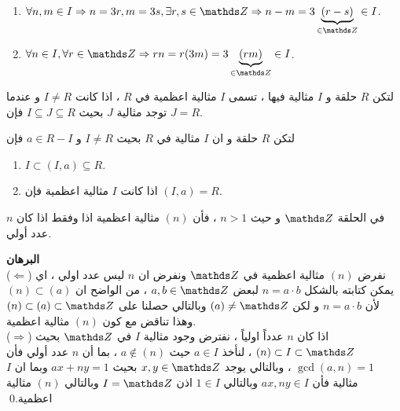  \setLR
 \begin{enumerate}[leftmargin=*, label=$\boxed{\arabic*}$]
 	\item $\forall n,m\in I \Rightarrow n=3r, m=3s, \exists r,s\in \Z \Rightarrow n-m =3\underbrace{(r-s)}_{\in \Z} \in I$.
 	\item $\forall n\in I, \forall r\in \Z \Rightarrow rn = r(3m) = 3\underbrace{(rm)}_{\in \Z} \in I$. 
 \end{enumerate}
 
 \setRL
 
 \begin{definition}
 	لتكن $R$ حلقة و $I$ مثالية فيها ، تسمى $I$ مثالية اعظمية في $R$ ، اذا كانت $I\neq R$ و عندما توجد مثالية $J$ بحيث 
 	$I \subseteq J \subseteq R$ فإن $J=R$.
 \end{definition}
 
 \begin{note}
 	لتكن $R$ حلقة و ان $I$ مثالية في $R$ بحيث  $I\neq R$ و $a\in R - I$ فإن
 	\begin{enumerate}
 		\item $I\subset (I, a) \subseteq R $.
 		\item  اذا كانت $I$ مثالية اعظمية فإن $(I, a) = R$.
 	\end{enumerate}
 \end{note}
 
 \begin{theorem}
 	في الحلقة $\Z$ و حيث $n>1$ ، فأن $(n)$ مثالية اعظمية اذا وفقط اذا كان $n$ عدد أولي.
 \end{theorem}
 
 \noindent
 \textbf{البرهان}\\
 \noindent
 ($\Leftarrow$) نفرض $(n)$ مثالية اعظمية في $\Z$ ونفرض ان $n$ ليس عدد اولي ، اي يمكن كتابته بالشكل $n=a\cdot b$ لبعض $a, b\in \Z$ ، من الواضح ان $(n) \subset (a)$ لأن $n=a\cdot b$ و لكن $(a)\neq \Z$ وبالتالي حصلنا على $(n) \subset (a) \subset \Z$ وهذا تناقض مع كون $(n)$ مثالية اعظمية.\\
 ($\Rightarrow$) اذا كان $n$ عدداً اولياً ، نفترض وجود مثالية $I$ في $\Z$ بحيث $(n )\subset I \subset \Z$ ، لنأخذ $a\in I$ حيث $a\notin (n)$ ، بما أن $n$  عدد أولي فأن $\gcd(a, n) = 1$ ، وبالتالي يوجد $x, y\in \Z$ بحيث $ax + ny=1$ وبما ان $I$ مثالية فأن $ax, ny\in I$ وبالتالي $1\in I$ اذن $I = \Z$ وبالتالي $(n)$ مثالية اعظمية.\qed  
 
 
